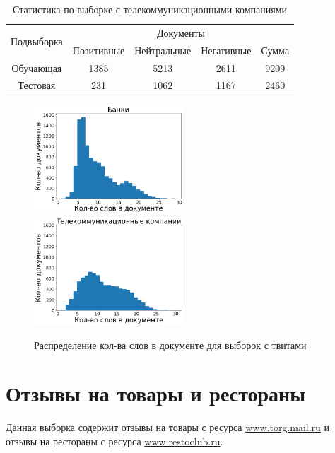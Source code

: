 \begin{table}[H]
\centering
\caption{Статистика по выборке с телекоммуникационными компаниями}
\label{tab:tkk}
\begin{tabular}{|c|c|c|c|c|}
\hline
\multirow{2}{*}{Подвыборка} & \multicolumn{4}{c|}{Документы}                \\ \cline{2-5} 
                            & Позитивные & Нейтральные & Негативные & Сумма \\ \hline
Обучающая                   & 1385        & 5213        & 2611       & 9209 \\ \hline
Тестовая                    & 231        & 1062        & 1167        & 2460  \\ \hline
\end{tabular}
\end{table}

\begin{figure}[H]
\caption{Распределение кол-ва слов в документе для выборок с твитами}
\includegraphics[width=0.5\textwidth]{images/hist_bank.png}
\includegraphics[width=0.5\textwidth]{images/hist_tkk.png}
\label{fig:hist_twitter}
\end{figure}
\section{Отзывы на товары и рестораны}
Данная выборка содержит отзывы на товары с ресурса \url{www.torg.mail.ru} и отзывы на рестораны с ресурса \url{www.restoclub.ru}.

